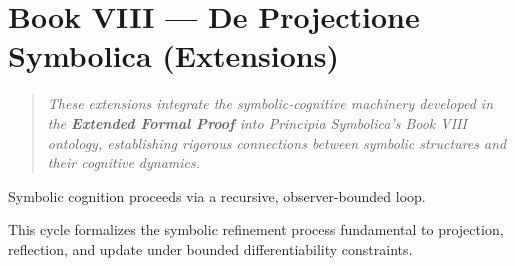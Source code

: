 \section*{Book VIII — De Projectione Symbolica (Extensions)}
\label{sec:bk8_de_projectione_symbolica}
\begin{quote}
\textit{These extensions integrate the symbolic-cognitive machinery developed in the \textbf{Extended Formal Proof} into \textit{Principia Symbolica}'s Book VIII ontology, establishing rigorous connections between symbolic structures and their cognitive dynamics.}
\end{quote}
\begin{axiom}
\label{axiom:bk8_curvature_transformation}
Symbolic cognition proceeds via a recursive, observer-bounded loop.
\vspace{0.5em}
\begin{center}
\end{center}
This cycle formalizes the symbolic refinement process fundamental to projection, reflection, and update under bounded differentiability constraints.
\end{axiom}
